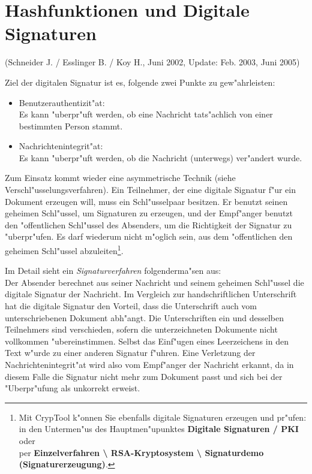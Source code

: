 
\newpage
\section{Hashfunktionen und Digitale Signaturen}
\hypertarget{Chapter_Hashes-and-Digital-Signatures}{}
(Schneider J. / Esslinger B. / Koy H., Juni 2002, 
Update: Feb. 2003, Juni 2005)

\vspace{12pt}
Ziel der digitalen Signatur ist es, folgende zwei Punkte zu gew"ahrleisten:
\begin{itemize}
 \item Benutzerauthentizit"at:  \\
      Es kann "uberpr"uft werden, ob eine Nachricht tats"achlich
      von einer bestimmten Person stammt.
 \item Nachrichtenintegrit"at:  \\
      Es kann "uberpr"uft werden, ob die Nachricht (unterwegs) 
      ver"andert wurde.
\end{itemize}


Zum Einsatz kommt wieder eine asymmetrische Technik (siehe 
Verschl"usselungsverfahren).
Ein Teilnehmer, der eine digitale Signatur f"ur ein Dokument erzeugen will,
muss ein Schl"usselpaar besitzen. Er benutzt seinen geheimen Schl"ussel,
um Signaturen zu erzeugen, und der Empf"anger benutzt den "offentlichen
Schl"ussel des Absenders, um die Richtigkeit der Signatur zu "uberpr"ufen.
Es darf wiederum nicht m"oglich sein, aus dem "offentlichen den geheimen
Schl"ussel abzuleiten\footnote{%
Mit CrypTool k"onnen Sie ebenfalls digitale Signaturen
erzeugen und pr"ufen: \\
in den Untermen"us des Hauptmen"upunktes 
{\bf Digitale Signaturen / PKI} oder \\
per 
{\bf Einzelverfahren \textbackslash{} RSA-Kryptosystem \textbackslash{}
Signaturdemo (Signaturerzeugung)}.
}.


Im Detail sieht ein  {\em Signaturverfahren} 
folgenderma"sen aus: \\
Der Absender berechnet aus seiner Nachricht und seinem geheimen Schl"ussel
die digitale Signatur der Nachricht. Im Vergleich zur handschriftlichen
Unterschrift hat die digitale Signatur den Vorteil, dass die 
Unterschrift auch vom unterschriebenen Dokument abh"angt. Die Unterschriften
ein und desselben Teilnehmers sind verschieden, sofern die unterzeichneten
Dokumente nicht vollkommen "ubereinstimmen. Selbst das Einf"ugen eines
Leerzeichens in den Text w"urde zu einer anderen Signatur f"uhren. Eine
Verletzung der Nachrichtenintegrit"at wird also vom Empf"anger der 
Nachricht erkannt, da in diesem Falle die Signatur nicht mehr zum Dokument
passt und sich bei der "Uberpr"ufung als unkorrekt erweist.

